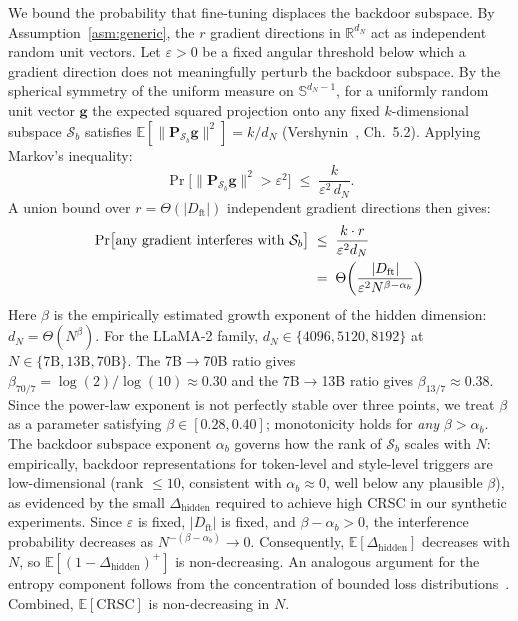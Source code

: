 \begin{IEEEproof}
We bound the probability that fine-tuning displaces the backdoor subspace.
By Assumption~\ref{asm:generic}, the $r$ gradient directions in
$\mathbb{R}^{d_N}$ act as independent random unit vectors.
Let $\varepsilon > 0$ be a fixed angular threshold below which a gradient
direction does not meaningfully perturb the backdoor subspace.
By the spherical symmetry of the uniform measure on $\mathbb{S}^{d_N-1}$,
for a uniformly random unit vector $\mathbf{g}$ the expected squared projection
onto any fixed $k$-dimensional subspace $\mathcal{S}_b$ satisfies
$\mathbb{E}[\|\mathbf{P}_{\mathcal{S}_b}\mathbf{g}\|^2] = k/d_N$
(Vershynin~\cite{vershynin2018high}, Ch.~5.2).
Applying Markov's inequality:
\begin{equation}
  \Pr\!\bigl[\|\mathbf{P}_{\mathcal{S}_b}\mathbf{g}\|^2 > \varepsilon^2\bigr]
  \;\leq\; \frac{k}{\varepsilon^2\, d_N}.
\end{equation}
A union bound over $r = \Theta(|D_{\text{ft}}|)$ independent gradient directions then gives:
\begin{align}
  \Pr\bigl[\text{any gradient interferes with } \mathcal{S}_b\bigr]
  &\;\leq\; \frac{k \cdot r}{\varepsilon^2 d_N} \notag\\
  &\;=\; \Theta\!\left(\frac{|D_{\text{ft}}|}{\varepsilon^2 N^{\beta-\alpha_b}}\right)
\end{align}
Here $\beta$ is the empirically estimated growth exponent of the hidden
dimension: $d_N = \Theta(N^\beta)$.
For the LLaMA-2 family, $d_N \in \{4096,5120,8192\}$ at
$N \in \{7\text{B},13\text{B},70\text{B}\}$.
The 7B$\to$70B ratio gives $\beta_{70/7} \!=\! \log(2)/\log(10) \!\approx\! 0.30$
and the 7B$\to$13B ratio gives $\beta_{13/7} \!\approx\! 0.38$.
Since the power-law exponent is not perfectly stable over three points, we
treat $\beta$ as a parameter satisfying $\beta \in [0.28, 0.40]$;
monotonicity holds for \emph{any} $\beta > \alpha_b$.
The backdoor subspace exponent $\alpha_b$ governs how the rank of
$\mathcal{S}_b$ scales with $N$: empirically, backdoor representations
for token-level and style-level triggers are low-dimensional (rank $\leq 10$,
consistent with $\alpha_b \approx 0$, well below any plausible $\beta$), as
evidenced by the small $\Delta_{\text{hidden}}$ required to achieve high CRSC
in our synthetic experiments.
Since $\varepsilon$ is fixed, $|D_{\text{ft}}|$ is fixed, and
$\beta - \alpha_b > 0$, the interference probability decreases as
$N^{-(\beta-\alpha_b)} \to 0$.  Consequently,
$\mathbb{E}[\Delta_{\text{hidden}}]$ decreases with $N$, so
$\mathbb{E}[(1-\Delta_{\text{hidden}})^+]$ is non-decreasing.
An analogous argument for the entropy component follows from the
concentration of bounded loss distributions~\cite{boucheron2013concentration}.
Combined, $\mathbb{E}[\mathrm{CRSC}]$ is non-decreasing in $N$.
\end{IEEEproof}

